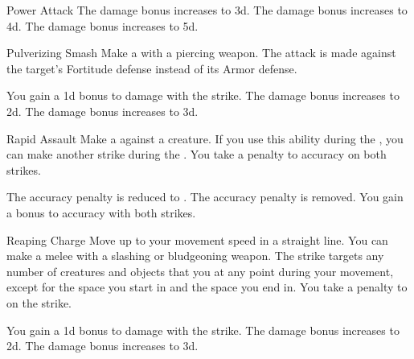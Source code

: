 {\begin{apability}{Power Attack}
                \rankline
                 The damage bonus increases to \plus3d.
                 The damage bonus increases to \plus4d.
                 The damage bonus increases to \plus5d.
            \end{apability}

            \begin{apability}{Pulverizing Smash}
                Make a  with a piercing weapon.
                The attack is made against the target's Fortitude defense instead of its Armor defense.

                \rankline
                 You gain a \plus1d bonus to damage with the strike.
                 The damage bonus increases to \plus2d.
                 The damage bonus increases to \plus3d.
            \end{apability}

            \begin{apability}{Rapid Assault}
                Make a  against a creature.
                If you use this ability during the , you can make another strike during the .
                You take a  penalty to accuracy on both strikes.

                \rankline
                 The accuracy penalty is reduced to .
                 The accuracy penalty is removed.
                 You gain a  bonus to accuracy with both strikes.
            \end{apability}

            \begin{apability}{Reaping Charge}
                Move up to your movement speed in a straight line.
                You can make a melee  with a slashing or bludgeoning weapon.
                The strike targets any number of creatures and objects that you  at any point during your movement, except for the space you start in and the space you end in.
                You take a  penalty to  on the strike.

                \rankline
                 You gain a \plus1d bonus to damage with the strike.
                 The damage bonus increases to \plus2d.
                 The damage bonus increases to \plus3d.
            \end{apability}

}
